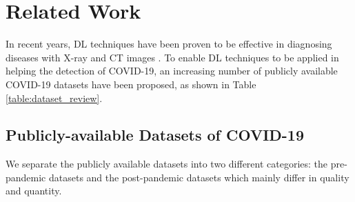 \documentclass[letterpaper]{article}
\begin{document}


\section{Related Work}
In recent years, DL techniques have been proven to be effective in diagnosing diseases with X-ray and CT images \cite{Litjens2017}. To enable DL techniques to be applied in helping the detection of COVID-19, an increasing number of publicly available COVID-19 datasets have been proposed, as shown in Table \ref{table:dataset_review}.


\subsection{Publicly-available Datasets of COVID-19}
We separate the publicly available datasets into two different categories: the pre-pandemic datasets and the post-pandemic datasets which mainly differ in quality and quantity.
\end{document}
